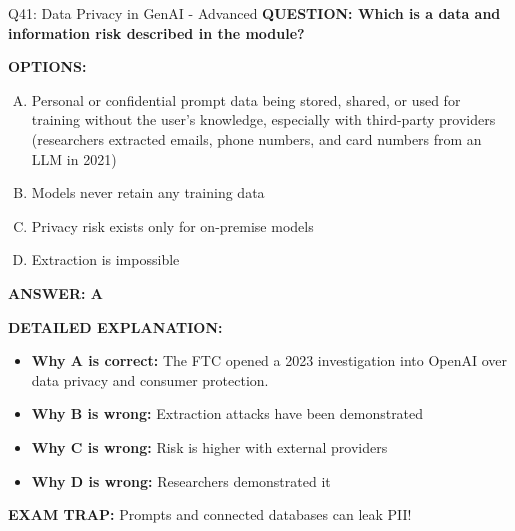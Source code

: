 \documentclass[8pt]{beamer}
\begin{document}
\begin{frame}[shrink=6]{Q41: Data Privacy in GenAI - Advanced}
\fontsize{6.5}{7.5}\selectfont
\textbf{QUESTION: Which is a data and information risk described in the module?}

\vspace{0.1cm}
\textbf{OPTIONS:}
\begin{enumerate}[A.]
\item Personal or confidential prompt data being stored, shared, or used for training without the user's knowledge, especially with third-party providers (researchers extracted emails, phone numbers, and card numbers from an LLM in 2021)
\item Models never retain any training data
\item Privacy risk exists only for on-premise models
\item Extraction is impossible
\end{enumerate}

\vspace{0.1cm}
\textcolor{myblue}{\textbf{ANSWER: A}}

\vspace{0.1cm}
\textbf{DETAILED EXPLANATION:}
\begin{itemize}
\item \textbf{Why A is correct:} The FTC opened a 2023 investigation into OpenAI over data privacy and consumer protection.
\item \textbf{Why B is wrong:} Extraction attacks have been demonstrated
\item \textbf{Why C is wrong:} Risk is higher with external providers
\item \textbf{Why D is wrong:} Researchers demonstrated it
\end{itemize}

\textcolor{myred}{\textbf{EXAM TRAP:}} Prompts and connected databases can leak PII!
\end{frame}
\end{document}
